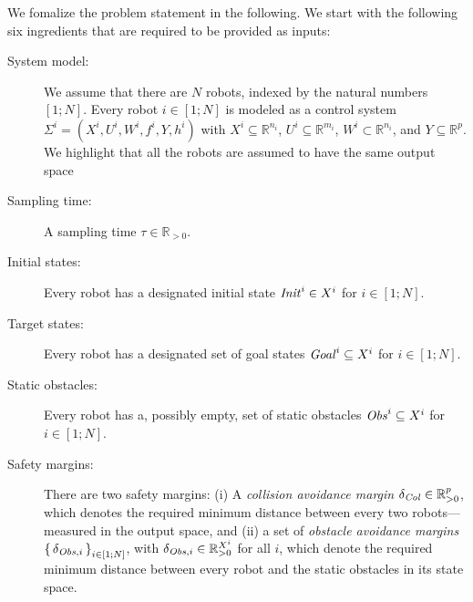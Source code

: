 We fomalize the problem statement in the following.
We start with the following six ingredients that are required to be provided as inputs:
\begin{description}
	\item[System model:] We assume that there are $N$ robots, indexed by the natural numbers $[1;N]$.
	Every robot $i\in [1;N]$ is modeled as a control system $\Sigma^i = (X^i, U^i, W^i, f^i, Y, h^i)$ with $X^i\subseteq \mathbb{R}^{n_i}$, $U^i\subseteq \mathbb{R}^{m_i}$, $W^i\subset \mathbb{R}^{n_i}$, and $Y\subseteq \mathbb{R}^p$.
	We highlight that all the robots are assumed to have the same output space
	\item[Sampling time:] A sampling time $\tau\in \mathbb{R}_{>0}$.
	\item[Initial states:] Every robot has a designated initial state $\mathit{Init}^i\in X^i$ for $i\in [1;N]$.
	\item[Target states:] Every robot has a designated set of goal states $\mathit{Goal}^i\subseteq X^i$  for $i\in [1;N]$.
	\item[Static obstacles:] Every robot has a, possibly empty, set of static obstacles $\mathit{Obs}^i\subseteq X^i$  for $i\in [1;N]$.
	\item[Safety margins:] There are two safety margins: (i) A \emph{collision avoidance margin} $\delta_{\mathit{Col}}\in \mathbb{R}^{p}_{>0}$, which denotes the required minimum distance between every two robots---measured in the output space, and (ii) a set of \emph{obstacle avoidance margins} $\set{\delta_{\mathit{Obs},i}}_{i\in [1;N]}$, with $\delta_{\mathit{Obs},i}\in \mathbb{R}^{X^i}_{>0}$ for all $i$, which denote the required minimum distance between every robot and the static obstacles in its state space.
\end{description}

